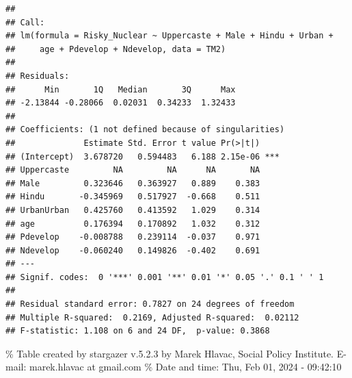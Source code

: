 \documentclass[
]{article}
\begin{document}
\begin{verbatim}
## 
## Call:
## lm(formula = Risky_Nuclear ~ Uppercaste + Male + Hindu + Urban + 
##     age + Pdevelop + Ndevelop, data = TM2)
## 
## Residuals:
##      Min       1Q   Median       3Q      Max 
## -2.13844 -0.28066  0.02031  0.34233  1.32433 
## 
## Coefficients: (1 not defined because of singularities)
##              Estimate Std. Error t value Pr(>|t|)    
## (Intercept)  3.678720   0.594483   6.188 2.15e-06 ***
## Uppercaste         NA         NA      NA       NA    
## Male         0.323646   0.363927   0.889    0.383    
## Hindu       -0.345969   0.517927  -0.668    0.511    
## UrbanUrban   0.425760   0.413592   1.029    0.314    
## age          0.176394   0.170892   1.032    0.312    
## Pdevelop    -0.008788   0.239114  -0.037    0.971    
## Ndevelop    -0.060240   0.149826  -0.402    0.691    
## ---
## Signif. codes:  0 '***' 0.001 '**' 0.01 '*' 0.05 '.' 0.1 ' ' 1
## 
## Residual standard error: 0.7827 on 24 degrees of freedom
## Multiple R-squared:  0.2169, Adjusted R-squared:  0.02112 
## F-statistic: 1.108 on 6 and 24 DF,  p-value: 0.3868
\end{verbatim}

\begingroup\setlength{\tabcolsep}{1pt}

\renewcommand{\arraystretch}{0.7}

\% Table created by stargazer v.5.2.3 by Marek Hlavac, Social Policy
Institute. E-mail: marek.hlavac at gmail.com \% Date and time: Thu, Feb
01, 2024 - 09:42:10
\end{document}
